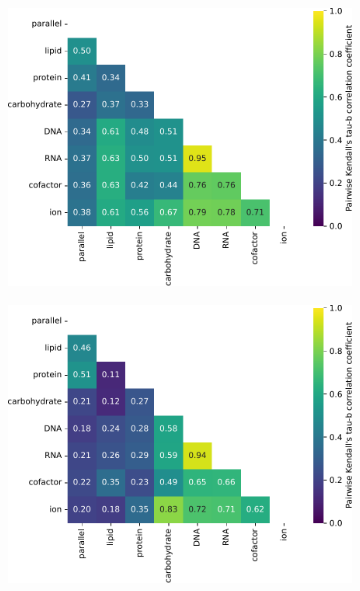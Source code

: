 \begin{figure}
  \centering
  \begin{subfigure}[t]{0.45\textwidth}
  \centering
    \includegraphics[width=\linewidth]{CompareEnzUse_glc01p69_pyrUnres_amm01p05_2.pdf}
    \caption{
    }
    \label{fig:model-rank-glc-highratio-kendall}
  \end{subfigure}%
  \begin{subfigure}[t]{0.45\textwidth}
  \centering
    \includegraphics[width=\linewidth]{CompareEnzUse_glc16p89_pyrUnres_ammUnres_2.pdf}
    \caption{
    }
    \label{fig:model-rank-glc-lowratio-kendall}
  \end{subfigure}


\end{figure}
